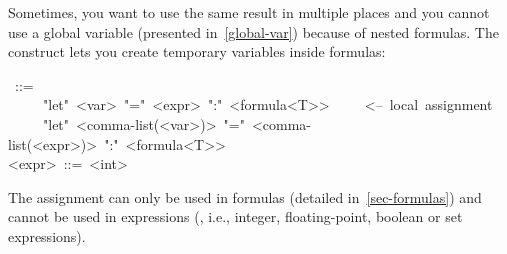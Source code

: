 \noindent Sometimes, you want to use the same result in multiple places and you
cannot use a global variable (presented in~\ref{global-var}) because of
nested formulas. The  construct lets you create temporary
variables inside formulas:%
\begin{mdpre}%
~::=\\
~~~~\textbar{}~"let"~{\textless{}var\textgreater{}}~"="~{\textless{}expr\textgreater{}}~":"~{\textless{}formula\textless{}T\textgreater{}\textgreater{}}~~~~~{\textless{}--~local~assignment}\\
~~~~\textbar{}~"let"~{\textless{}comma-list(\textless{}var\textgreater{})\textgreater{}}~"="~{\textless{}comma-list(\textless{}expr\textgreater{})\textgreater{}}~":"~{\textless{}formula\textless{}T\textgreater{}\textgreater{}}\\
{\textless{}expr\textgreater{}}~::=~{\textless{}int\textgreater{}}%
\end{mdpre}\noindent The  assignment can only be used in formulas (detailed
in~\ref{sec-formulas}) and cannot be used in expressions (, i.e.,
integer, floating-point, boolean or set expressions).

